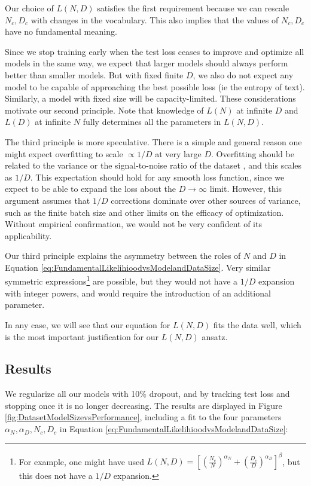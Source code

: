 \documentclass[english]{article}
\begin{document}
Our choice of $L(N,D)$ satisfies the first requirement because we can rescale $N_c, D_c$ with changes in the vocabulary.  This also implies that the values of $N_c, D_c$ have no fundamental meaning.

Since we stop training early when the test loss ceases to improve and optimize all models in the same way, we expect that larger models should always perform better than smaller models.  But with fixed finite $D$, we also do not expect any model to be capable of approaching the best possible loss (ie the entropy of text).  Similarly, a model with fixed size will be capacity-limited.  These considerations motivate our second principle.
Note that knowledge of $L(N)$ at infinite $D$ and $L(D)$ at infinite $N$ fully determines all the parameters in $L(N,D)$.

The third principle is more speculative.  There is a simple and general reason one might expect overfitting to scale $\propto 1/D$ at very large $D$.  Overfitting should be related to the variance or the signal-to-noise ratio of the dataset \cite{1710.03667}, and this scales as $1/D$.  This expectation should hold for any smooth loss function, since we expect to be able to expand the loss about the $D \to \infty$ limit.   However, this argument assumes that $1/D$ corrections dominate over other sources of variance, such as the finite batch size and  other limits on the efficacy of optimization.  Without empirical confirmation, we would not be very confident of its applicability.

Our third principle explains the asymmetry between the roles of $N$ and $D$ in Equation \eqref{eq:FundamentalLikelihioodvsModelandDataSize}.  Very similar symmetric expressions\footnote{For example, one might have used $L(N,D) =  \left[ \left( \frac{N_c}{N} \right)^{\alpha_N} + \left( \frac{D_c}{D} \right)^{\alpha_D}  \right]^\beta$, but this does not  have a $1/D$ expansion.} are possible, but they would not have a $1/D$ expansion with integer powers, and would require the introduction of an additional parameter.

In any case, we will see that our equation for $L(N,D)$ fits the data  well, which is the most important justification for our $L(N,D)$ ansatz.


\subsection{Results}

We regularize all our models with 10\% dropout, and by tracking test loss and stopping once it is no longer decreasing.   The results are displayed in Figure \ref{fig:DatasetModelSizevsPerformance}, including a fit to the four parameters $\alpha_N, \alpha_D, N_c, D_c$ in Equation \eqref{eq:FundamentalLikelihioodvsModelandDataSize}:
\end{document}
